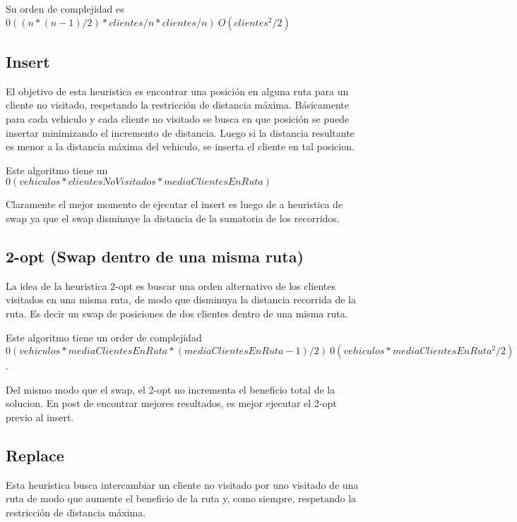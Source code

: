 \bigskip

Su orden de complejidad es $0((n * (n-1) / 2 ) * clientes/n * clientes/n) ~ O(clientes^2/2)$

\subsection{Insert}

El objetivo de esta heuristica es encontrar una posición en alguna ruta para un cliente no visitado, respetando la restricción de distancia máxima. Básicamente para cada vehiculo y cada cliente no visitado se busca en que posición se puede insertar minimizando el incremento de distancia. Luego si la distancia resultante es menor a la distancia máxima del vehiculo, se inserta el cliente en tal posicion.

\bigskip

Este algoritmo tiene un $0(vehiculos * clientesNoVisitados * mediaClientesEnRuta)$

\bigskip

Claramente el mejor momento de ejecutar el insert es luego de a heuristica de swap ya que el swap disminuye la distancia de la sumatoria de los recorridos.

\subsection{2-opt (Swap dentro de una misma ruta)}

La idea de la heuristica 2-opt es buscar una orden alternativo de los clientes visitados en una misma ruta, de modo que disminuya la distancia recorrida de la ruta. Es decir un swap de posiciones de dos clientes dentro de una misma ruta.

\bigskip

Este algoritmo tiene un order de complejidad $0(vehiculos * mediaClientesEnRuta  * (mediaClientesEnRuta - 1) / 2) ~ 0 (vehiculos * mediaClientesEnRuta^2 / 2)$.

\bigskip

Del mismo modo que el swap, el 2-opt no incrementa el beneficio total de la solucion. En post de encontrar mejores resultados, es mejor ejecutar el 2-opt previo al insert.

\subsection{Replace}

Esta heuristica busca intercambiar un cliente no visitado por uno visitado de una ruta de modo que aumente el beneficio de la ruta y, como siempre, respetando la restricción de distancia máxima.


